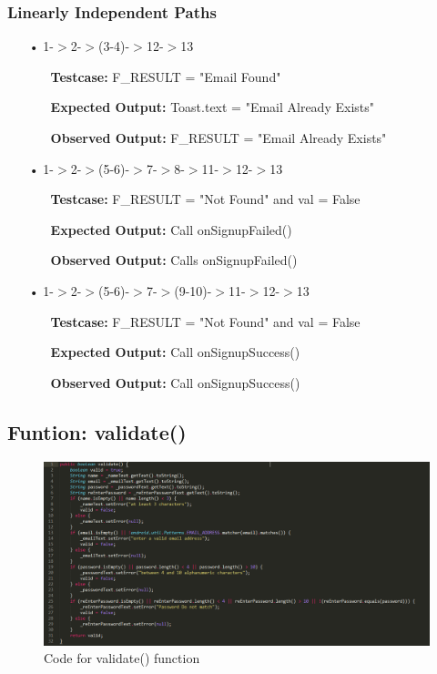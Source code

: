 \documentclass{scrreprt}
\begin{document}
\subsubsection{Linearly Independent Paths}
\begin{enumerate}
\item[•]1-$>$2-$>$(3-4)-$>$12-$>$13
\begin{itemize}
\item[]\textbf{Testcase: }F_RESULT = "Email Found"
\item[]\textbf{Expected Output: }Toast.text = "Email Already Exists"
\item[]\textbf{Observed Output: }F_RESULT = "Email Already Exists"
\end{itemize}

\item[•]1-$>$2-$>$(5-6)-$>$7-$>$8-$>$11-$>$12-$>$13
\begin{itemize}
\item[]\textbf{Testcase: }F_RESULT = "Not Found" and val = False
\item[]\textbf{Expected Output: }Call onSignupFailed()
\item[]\textbf{Observed Output: }Calls onSignupFailed()
\end{itemize}

\item[•]1-$>$2-$>$(5-6)-$>$7-$>$(9-10)-$>$11-$>$12-$>$13
\begin{itemize}
\item[]\textbf{Testcase: }F_RESULT = "Not Found" and val = False
\item[]\textbf{Expected Output: }Call onSignupSuccess()
\item[]\textbf{Observed Output: }Call onSignupSuccess()
\end{itemize}

\end{enumerate}	

\subsection{Funtion: validate()}
\begin{figure}[H]
\centering
\includegraphics[width=\textwidth, keepaspectratio]{validateSignupCode.png}
\caption{Code for validate() function}
\end{figure}
\end{document}
